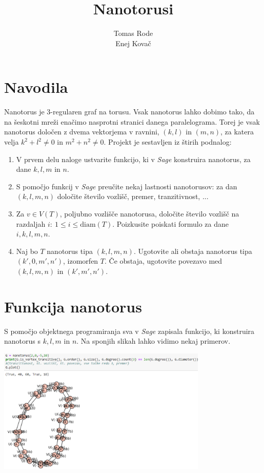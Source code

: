\documentclass[a4paper, 11 pt]{article}
\title{Nanotorusi}
\author{Tomas Rode \\ Enej Kovač}
\begin{document}
\maketitle

\section{Navodila}

Nanotorus je 3-regularen graf na torusu. Vsak nanotorus lahko dobimo tako, da na šeskotni mreži enačimo nasprotni stranici danega paralelograma. Torej je vsak nanotorus določen z dvema vektorjema v ravnini, $(k,l)$ in $(m, n)$, za katera velja $k^2 + l^2 \neq 0$ in $m^2 + n^2 \neq 0$. Projekt je sestavljen iz štirih podnalog:

\begin{enumerate}
  \item V prvem delu naloge ustvarite funkcijo, ki v \textit{Sage} konstruira nanotorus, za dane $k, l, m$ in $n$.
  \item S pomočjo funkcij v \textit{Sage} preučite nekaj lastnosti nanotorusov: za dan $(k, l, m, n)$ določite število vozlišč, premer, tranzitivnost, ...
  \item Za $v \in V(T)$, poljubno vozlišče nanotorusa, določite število vozlišč na razdaljah $i:\ 1 \leq i \leq \textrm{diam}(T)$. Poizkusite poiskati formulo za dane $i, k, l, m, n$.
  \item Naj bo $T$ nanotorus tipa $(k, l, m, n)$. Ugotovite ali obstaja nanotorus tipa $(k', 0, m', n')$, izomorfen $T$. Če obstaja, ugotovite povezavo med $(k, l, m, n)$ in $(k', m', n')$.
\end{enumerate}

\section{Funkcija nanotorus}

S pomočjo objektnega programiranja sva v \textit{Sage} zapisala funkcijo, ki konstruira nanotorus s $k, l, m$ in $n$. Na sponjih slikah lahko vidimo nekaj primerov.

\begin{center}
\includegraphics[width=10cm]{nano2}
\end{center}
\vspace{1cm}
\end{document}
